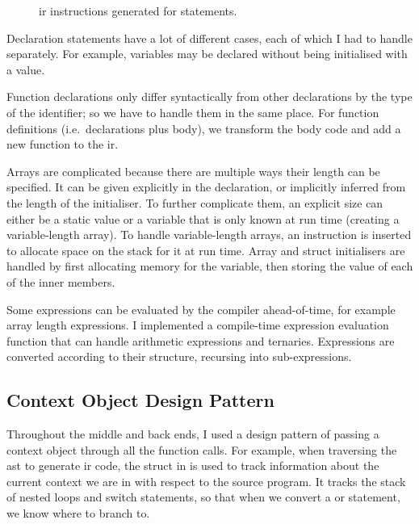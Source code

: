 \documentclass[00-main.tex]{subfiles}
\begin{document}
\begin{figure}[t]
  \centering
  \caption{\gls{ir} instructions generated for  statements.}
  \label{fig:instr structure for switch statements} %
\end{figure}

Declaration statements have a lot of different cases, each of which I had to handle separately.
For example, variables may be declared without being initialised with a value.

Function declarations only differ syntactically from other declarations by the type of the identifier; so we have to handle them in the same place.
For function definitions (i.e.\ declarations plus body), we transform the body code and add a new function to the \gls{ir}.

Arrays are complicated because there are multiple ways their length can be specified.
It can be given explicitly in the declaration, or implicitly inferred from the length of the initialiser.
To further complicate them, an explicit size can either be a static value or a variable that is only known at run time (creating a variable-length array).
To handle variable-length arrays, an instruction is inserted to allocate space on the stack for it at run time.
Array and struct initialisers are handled by first allocating memory for the variable, then storing the value of each of the inner members.


Some expressions can be evaluated by the compiler ahead-of-time, for example array length expressions.
I implemented a compile-time expression evaluation function that can handle arithmetic expressions and ternaries.
Expressions are converted according to their structure, recursing into sub-expressions.


\subsection{Context Object Design Pattern}\label{sec:impl:context object design pattern}

Throughout the middle and back ends, I used a design pattern of passing a context object through all the function calls.
For example, when traversing the \gls{ast} to generate \gls{ir} code, the  struct in  is used to track information about the current context we are in with respect to the source program.
It tracks the stack of nested loops and switch statements, so that when we convert a  or  statement, we know where to branch to.
\end{document}
